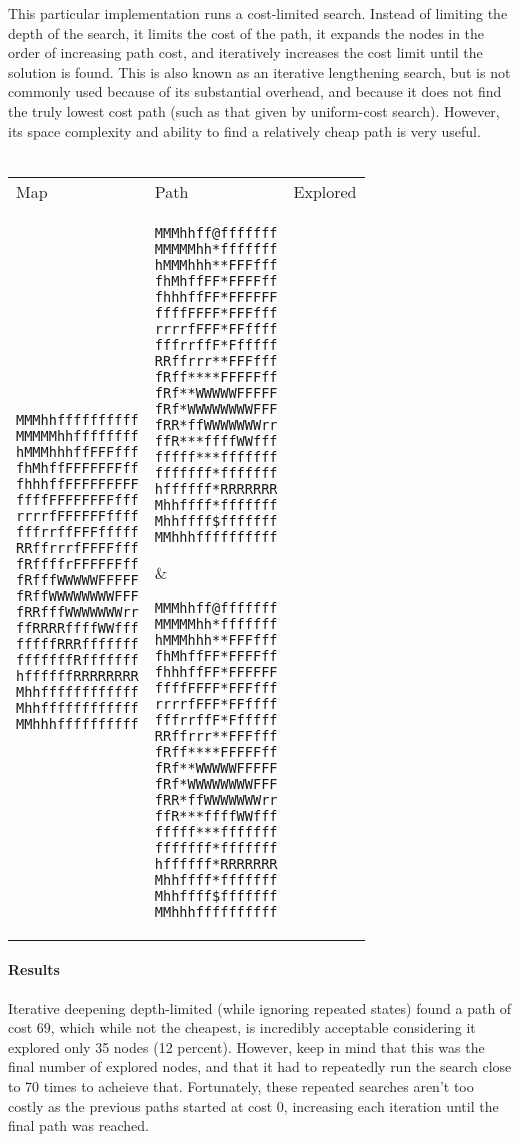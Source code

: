 \documentclass[12pt, article]{scrartcl}
\begin{document}
This particular implementation runs a cost-limited search. Instead of limiting the depth of the search, it limits the cost of the path, it expands the nodes in the order of increasing path cost, and iteratively increases the cost limit until the solution is found. This is also known as an iterative lengthening search, but is not commonly used because of its substantial overhead, and because it does not find the truly lowest cost path (such as that given by uniform-cost search). However, its space complexity and ability to find a relatively cheap path is very useful. \\ \\
\begin{tabular}{p{2in} p{2in} p{2in}}
Map & Path & Explored \\

\begin{verbatim}
MMMhhffffffffff
MMMMMhhffffffff
hMMMhhhffFFFfff
fhMhffFFFFFFFff
fhhhffFFFFFFFFF
ffffFFFFFFFFfff
rrrrfFFFFFFffff
fffrrffFFFfffff
RRffrrrfFFFFfff
fRffffrFFFFFFff
fRfffWWWWWFFFFF
fRffWWWWWWWWFFF
fRRfffWWWWWWWrr
ffRRRRffffWWfff
fffffRRRfffffff
fffffffRfffffff
hffffffRRRRRRRR
Mhhffffffffffff
Mhhffffffffffff
MMhhhffffffffff
\end{verbatim}
&
\begin{verbatim}
MMMhhff@fffffff
MMMMMhh*fffffff
hMMMhhh**FFFfff
fhMhffFF*FFFFff
fhhhffFF*FFFFFF
ffffFFFF*FFFfff
rrrrfFFF*FFffff
fffrrffF*Ffffff
RRffrrr**FFFfff
fRff****FFFFFff
fRf**WWWWWFFFFF
fRf*WWWWWWWWFFF
fRR*ffWWWWWWWrr
ffR***ffffWWfff
fffff***fffffff
fffffff*fffffff
hffffff*RRRRRRR
Mhhffff*fffffff
Mhhffff$fffffff
MMhhhffffffffff
\end{verbatim}
&
\begin{verbatim}
MMMhhff@fffffff
MMMMMhh*fffffff
hMMMhhh**FFFfff
fhMhffFF*FFFFff
fhhhffFF*FFFFFF
ffffFFFF*FFFfff
rrrrfFFF*FFffff
fffrrffF*Ffffff
RRffrrr**FFFfff
fRff****FFFFFff
fRf**WWWWWFFFFF
fRf*WWWWWWWWFFF
fRR*ffWWWWWWWrr
ffR***ffffWWfff
fffff***fffffff
fffffff*fffffff
hffffff*RRRRRRR
Mhhffff*fffffff
Mhhffff$fffffff
MMhhhffffffffff
\end{verbatim}
\end{tabular}
\paragraph{Results}
Iterative deepening depth-limited (while ignoring repeated states) found a path of cost 69, which while not the cheapest, is incredibly acceptable considering it explored only 35 nodes (12 percent). However, keep in mind that this was the final number of explored nodes, and that it had to repeatedly run the search close to 70 times to acheieve that. Fortunately, these repeated searches aren't too costly as the previous paths started at cost 0, increasing each iteration until the final path was reached. \\
\end{document}
